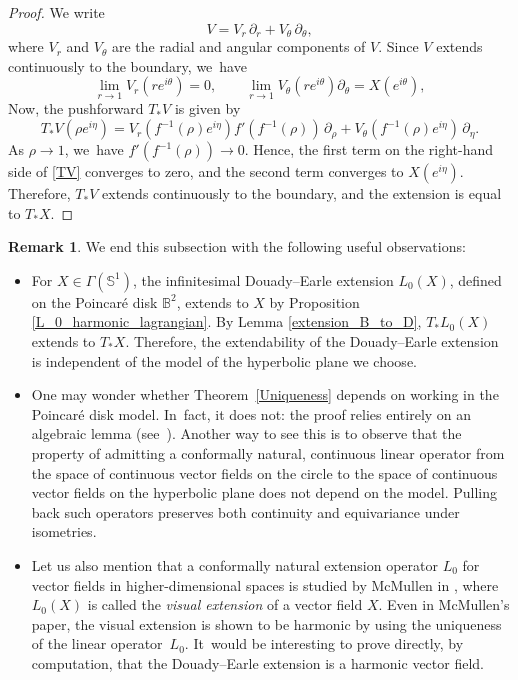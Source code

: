 \documentclass[11pt]{article}
\theoremstyle{plain}
\theoremstyle{definition}
\newtheorem{remark}[cor]{Remark}
\begin{document}
\begin{proof}
We write
\[
V = V_r\, \partial_r + V_\theta\, \partial_\theta,
\]
where \(V_r\) and \(V_\theta\) are the radial and angular components of \(V\). Since \(V\) extends continuously to the boundary, we~have
\[
\lim_{r \to 1} V_r(re^{i\theta}) = 0, \qquad \lim_{r \to 1} V_\theta(re^{i\theta})\partial_{\theta} = X(e^{i\theta}),
\]
Now, the pushforward \(T_*V\) is given by
\begin{equation}\label{TV}
T_*V(\rho e^{i\eta}) = V_r(f^{-1}(\rho)e^{i\eta}) f'(f^{-1}(\rho))\, \partial_\rho + V_\theta(f^{-1}(\rho)e^{i\eta})\, \partial_\eta.
\end{equation}
As \(\rho \to 1\), we~have \(f'(f^{-1}(\rho)) \to 0\). Hence, the first term on the right-hand side of \eqref{TV} converges to zero, and the second term converges to \(X(e^{i\eta})\). Therefore, \(T_*V\) extends continuously to the boundary, and the extension is equal to \(T_*X\).
\end{proof}
\begin{remark}
We end this subsection with the following useful observations:
\begin{itemize}
\item For \(X \in \Gamma(\mathbb{S}^1)\), the infinitesimal Douady–Earle extension \(L_0(X)\), defined on the Poincaré disk \(\mathbb{B}^2\), extends to \(X\) by Proposition \ref{L_0_harmonic_lagrangian}. By Lemma \ref{extension_B_to_D}, \(T_*L_0(X)\) extends to \(T_*X\). Therefore, the extendability of the Douady–Earle extension is independent of the model of the hyperbolic plane we choose.

\item One may wonder whether Theorem~\ref{Uniqueness} depends on working in the Poincaré disk model. In~fact, it does not: the proof relies entirely on an algebraic lemma (see~\cite[\S 3]{Uniqueness_of_operator_L}). Another way to see this is to observe that the property of admitting a conformally natural, continuous linear operator from the space of continuous vector fields on the circle to the space of continuous vector fields on the hyperbolic plane does not depend on the model. Pulling back such operators preserves both continuity and equivariance under isometries.

\item Let us also mention that a conformally natural extension operator \(L_0\) for vector fields in higher-dimensional spaces is studied by McMullen in \cite[App.\,B]{mullen}, where \(L_0(X)\) is called the \emph{visual extension} of a vector field \(X\). Even in McMullen's paper, the visual extension is shown to be harmonic by using the uniqueness of the linear operator~\(L_0 \). It~would be interesting to prove directly, by computation, that the Douady–Earle extension is a harmonic vector field.
\end{itemize}
\end{remark}
\end{document}
